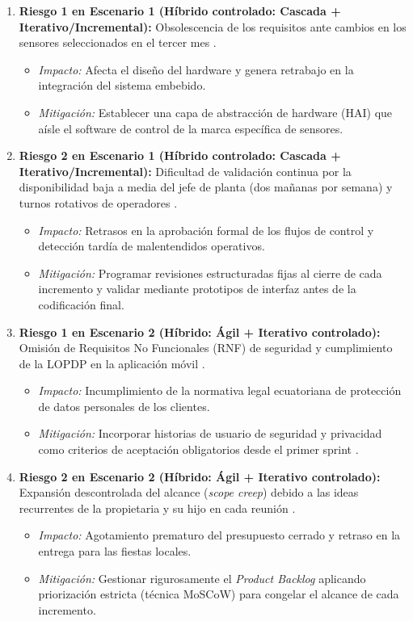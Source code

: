 \documentclass[12pt,a4paper]{article}
\begin{document}
\begin{enumerate}
    \item \textbf{Riesgo 1 en Escenario 1 (Híbrido controlado: Cascada + Iterativo/Incremental):} Obsolescencia de los requisitos ante cambios en los sensores seleccionados en el tercer mes \cite{GA_Prac_01}.
        \begin{itemize}
            \item \textit{Impacto:} Afecta el diseño del hardware y genera retrabajo en la integración del sistema embebido.
            \item \textit{Mitigación:} Establecer una capa de abstracción de hardware (HAI) que aísle el software de control de la marca específica de sensores.
        \end{itemize}
    \item \textbf{Riesgo 2 en Escenario 1 (Híbrido controlado: Cascada + Iterativo/Incremental):} Dificultad de validación continua por la disponibilidad baja a media del jefe de planta (dos mañanas por semana) y turnos rotativos de operadores \cite{GA_Prac_01}.
        \begin{itemize}
            \item \textit{Impacto:} Retrasos en la aprobación formal de los flujos de control y detección tardía de malentendidos operativos.
            \item \textit{Mitigación:} Programar revisiones estructuradas fijas al cierre de cada incremento y validar mediante prototipos de interfaz antes de la codificación final.
        \end{itemize}

    \item \textbf{Riesgo 1 en Escenario 2 (Híbrido: Ágil + Iterativo controlado):} Omisión de Requisitos No Funcionales (RNF) de seguridad y cumplimiento de la LOPDP en la aplicación móvil \cite{GA_Prac_01}.
        \begin{itemize}
            \item \textit{Impacto:} Incumplimiento de la normativa legal ecuatoriana de protección de datos personales de los clientes.
            \item \textit{Mitigación:} Incorporar historias de usuario de seguridad y privacidad como criterios de aceptación obligatorios desde el primer sprint \cite{Pohl2025}.
        \end{itemize}
    \item \textbf{Riesgo 2 en Escenario 2 (Híbrido: Ágil + Iterativo controlado):} Expansión descontrolada del alcance (\emph{scope creep}) debido a las ideas recurrentes de la propietaria y su hijo en cada reunión \cite{GA_Prac_01}.
        \begin{itemize}
            \item \textit{Impacto:} Agotamiento prematuro del presupuesto cerrado y retraso en la entrega para las fiestas locales.
            \item \textit{Mitigación:} Gestionar rigurosamente el \emph{Product Backlog} aplicando priorización estricta (técnica MoSCoW) para congelar el alcance de cada incremento.
        \end{itemize}


\end{enumerate}
\end{document}
